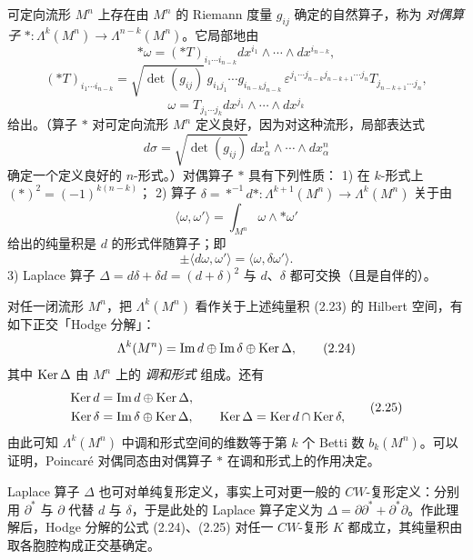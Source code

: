 可定向流形 $M^n$ 上存在由 $M^n$ 的 Riemann 度量 $g_{ij}$ 确定的自然算子，称为 \emph{对偶算子}
$*:\Lambda^k(M^n)\to\Lambda^{n-k}(M^n)$。它局部地由
\[
  *\omega=(*T)_{i_1\cdots i_{n-k}}dx^{i_1}\wedge\cdots\wedge dx^{i_{n-k}},
\]
\[
  (*T)_{i_1\cdots i_{n-k}}=\sqrt{\det(g_{ij})}\,
  g_{i_1j_1}\cdots g_{i_{n-k}j_{n-k}}\,
  \varepsilon^{j_1\cdots j_{n-k}j_{n-k+1}\cdots j_n}T_{j_{n-k+1}\cdots j_n},
\]
\[
  \omega=T_{j_1\cdots j_k}dx^{j_1}\wedge\cdots\wedge dx^{j_k}
\]
给出。（算子 $*$ 对可定向流形 $M^n$ 定义良好，因为对这种流形，局部表达式
\[
  d\sigma=\sqrt{\det(g_{ij})}\,dx_\alpha^1\wedge\cdots\wedge dx_\alpha^n
\]
确定一个定义良好的 $n$-形式。）对偶算子 $*$ 具有下列性质：
1) 在 $k$-形式上 $(*)^2=(-1)^{k(n-k)}$；
2) 算子 $\delta=*^{-1}d*:\Lambda^{k+1}(M^n)\to\Lambda^k(M^n)$ 关于由
\begin{equation}
  \langle\omega,\omega'\rangle=\int_{M^n}\omega\wedge*\omega' \tag{2.23}
\end{equation}
给出的纯量积是 $d$ 的形式伴随算子；即
\[
  \pm\langle d\omega,\omega'\rangle=\langle\omega,\delta\omega'\rangle.
\]
3) Laplace 算子 $\Delta=d\delta+\delta d=(d+\delta)^2$ 与 $d$、$\delta$ 都可交换（且是自伴的）。

对任一闭流形 $M^n$，把 $\Lambda^k(M^n)$ 看作关于上述纯量积 (2.23) 的 Hilbert 空间，有如下正交「Hodge 分解」：
\begin{equation}
  \Lambda^k(M^n)=\operatorname{Im} d\oplus\operatorname{Im}\delta\oplus\operatorname{Ker}\Delta, \tag{2.24}
\end{equation}
其中 $\operatorname{Ker}\Delta$ 由 $M^n$ 上的 \emph{调和形式} 组成。还有
\begin{equation}
  \begin{aligned}
    \operatorname{Ker} d&=\operatorname{Im} d\oplus\operatorname{Ker}\Delta,\\
    \operatorname{Ker}\delta&=\operatorname{Im}\delta\oplus\operatorname{Ker}\Delta,\qquad
    \operatorname{Ker}\Delta=\operatorname{Ker} d\cap\operatorname{Ker}\delta,
  \end{aligned} \tag{2.25}
\end{equation}
由此可知 $\Lambda^k(M^n)$ 中调和形式空间的维数等于第 $k$ 个 Betti 数 $b_k(M^n)$。可以证明，Poincaré 对偶同态由对偶算子 $*$ 在调和形式上的作用决定。

Laplace 算子 $\Delta$ 也可对单纯复形定义，事实上可对更一般的 $CW$-复形定义：分别用 $\partial^*$ 与 $\partial$ 代替 $d$ 与 $\delta$，于是此处的 Laplace 算子定义为 $\Delta=\partial\partial^*+\partial^*\partial$。作此理解后，Hodge 分解的公式 (2.24)、(2.25) 对任一 $CW$-复形 $K$ 都成立，其纯量积由取各胞腔构成正交基确定。

